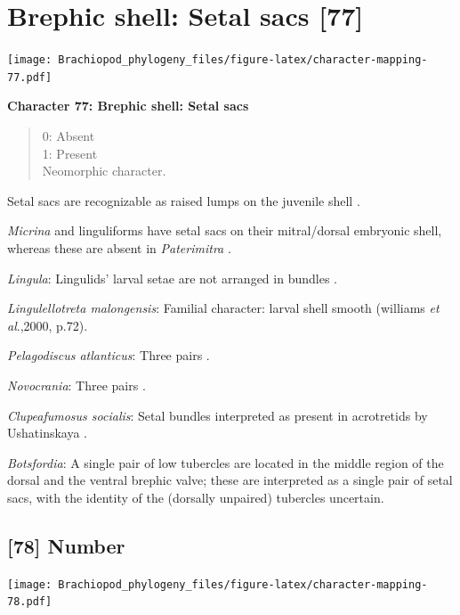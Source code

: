 \documentclass[]{book}
\theoremstyle{definition}
\theoremstyle{definition}
\theoremstyle{definition}
\theoremstyle{remark}
\begin{document}
\hypertarget{brephic-shell-setal-sacs-77}{%
\section{Brephic shell: Setal sacs
{[}77{]}}\label{brephic-shell-setal-sacs-77}}

\texttt{[image: Brachiopod\_phylogeny\_files/figure-latex/character-mapping-77.pdf]}

\textbf{Character 77: Brephic shell: Setal sacs}

\begin{quote}
0: Absent\\
1: Present\\
Neomorphic character.
\end{quote}

Setal sacs are recognizable as raised lumps on the juvenile shell
\citep[see][]{Bassett2017Earliestontogeny}.

\emph{Micrina} and linguliforms have setal sacs on their mitral/dorsal
embryonic shell, whereas these are absent in \emph{Paterimitra}
\citep{Holmer2011Firstrecord}.

\emph{Lingula}: Lingulids' larval setae are not arranged in bundles
\citep{Carlson1995Phylogeneticrelationships}.

\emph{Lingulellotreta malongensis}: Familial character: larval shell
smooth (williams \emph{et al}.,2000, p.72).

\emph{Pelagodiscus atlanticus}: Three pairs
\citep{Carlson1995Phylogeneticrelationships}.

\emph{Novocrania}: Three pairs
\citep{Carlson1995Phylogeneticrelationships}.

\emph{Clupeafumosus socialis}: Setal bundles interpreted as present in
acrotretids by Ushatinskaya \citeyearpar{Ushatinskaya2016Protegulumand}.

\emph{Botsfordia}: A single pair of low tubercles are \citep[ state
``may be'']{Ushatinskaya2016Revisionof} located in the middle region of
the dorsal and the ventral brephic valve; these are interpreted as a
single pair of setal sacs, with the identity of the (dorsally unpaired)
tubercles uncertain.

\hypertarget{number}{%
\subsection*{{[}78{]} Number}\label{number}}

\texttt{[image: Brachiopod\_phylogeny\_files/figure-latex/character-mapping-78.pdf]}
\end{document}

